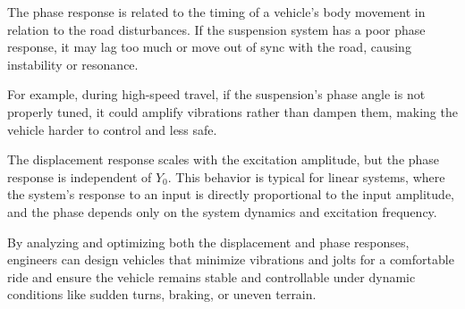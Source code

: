 \documentclass[12pt,a4paper]{article}
\begin{document}
The phase response is related to the timing of a vehicle's body movement in relation to the road disturbances. If the suspension system has a poor phase response, it may lag too much or move out of sync with the road, causing instability or resonance.

For example, during high-speed travel, if the suspension's phase angle is not properly tuned, it could amplify vibrations rather than dampen them, making the vehicle harder to control and less safe.

{\vspace{10pt}}

{\vspace{5pt}}
The displacement response scales with the excitation amplitude, but the phase response is independent of \(Y_0\).
This behavior is typical for linear systems, where the system's response to an input is directly proportional to the input amplitude, and the phase depends only on the system dynamics and excitation frequency.

By analyzing and optimizing both the displacement and phase responses, engineers can design vehicles that minimize vibrations and jolts for a comfortable ride and ensure the vehicle remains stable and controllable under dynamic conditions like sudden turns, braking, or uneven terrain.
{\vspace{5pt}}

    
\end{document}
